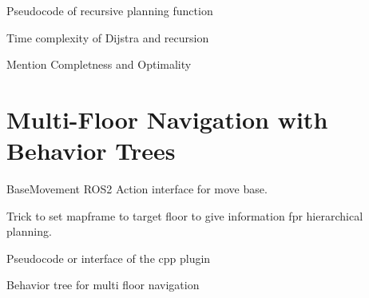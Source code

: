 Pseudocode of recursive planning function

Time complexity of Dijstra and recursion

Mention Completness and Optimality





\section{Multi-Floor Navigation with Behavior Trees}
\label{sec:multi_floor_behavior_trees}

BaseMovement ROS2 Action interface for move base.

Trick to set mapframe to target floor to give information fpr hierarchical planning.

Pseudocode or interface of the cpp plugin

Behavior tree for multi floor navigation



